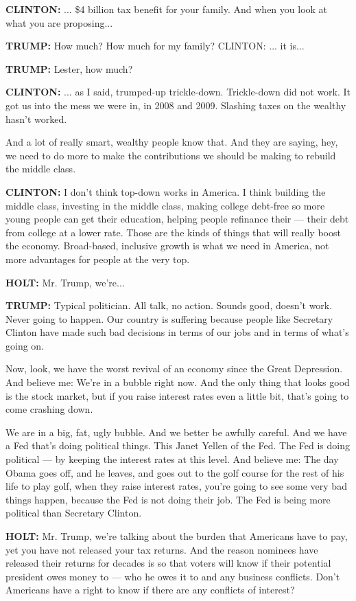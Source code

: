 \textbf{CLINTON:} ... \$4 billion tax benefit for your family. And when
you look at what you are proposing...

\textbf{TRUMP:} How much? How much for my family? CLINTON: ... it is...

\textbf{TRUMP:} Lester, how much?

\textbf{CLINTON:} ... as I said, trumped-up trickle-down. Trickle-down
did not work. It got us into the mess we were in, in 2008 and 2009.
Slashing taxes on the wealthy hasn't worked.

And a lot of really smart, wealthy people know that. And they are
saying, hey, we need to do more to make the contributions we should be
making to rebuild the middle class.

\textbf{CLINTON:} I don't think top-down works in America. I think
building the middle class, investing in the middle class, making college
debt-free so more young people can get their education, helping people
refinance their --- their debt from college at a lower rate. Those are
the kinds of things that will really boost the economy. Broad-based,
inclusive growth is what we need in America, not more advantages for
people at the very top.

\textbf{HOLT:} Mr. Trump, we're...

\textbf{TRUMP:} Typical politician. All talk, no action. Sounds good,
doesn't work. Never going to happen. Our country is suffering because
people like Secretary Clinton have made such bad decisions in terms of
our jobs and in terms of what's going on.

Now, look, we have the worst revival of an economy since the Great
Depression. And believe me: We're in a bubble right now. And the only
thing that looks good is the stock market, but if you raise interest
rates even a little bit, that's going to come crashing down.

We are in a big, fat, ugly bubble. And we better be awfully careful. And
we have a Fed that's doing political things. This Janet Yellen of the
Fed. The Fed is doing political --- by keeping the interest rates at
this level. And believe me: The day Obama goes off, and he leaves, and
goes out to the golf course for the rest of his life to play golf, when
they raise interest rates, you're going to see some very bad things
happen, because the Fed is not doing their job. The Fed is being more
political than Secretary Clinton.

\textbf{HOLT:} Mr. Trump, we're talking about the burden that Americans
have to pay, yet you have not released your tax returns. And the reason
nominees have released their returns for decades is so that voters will
know if their potential president owes money to --- who he owes it to
and any business conflicts. Don't Americans have a right to know if
there are any conflicts of interest?

